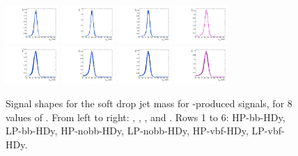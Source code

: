 \begin{figure}[htbp]
  \includegraphics[width=0.18\textwidth]{fig/2Dfit/templateSignalVsMX_fromDC_VBFGbuToWW_MJJ_mu_HP_vbf_HDy.pdf}
  \includegraphics[width=0.18\textwidth]{fig/2Dfit/templateSignalVsMX_fromDC_VBFRadToWW_MJJ_mu_HP_vbf_HDy.pdf}
  \includegraphics[width=0.18\textwidth]{fig/2Dfit/templateSignalVsMX_fromDC_VBFZprToWW_MJJ_mu_HP_vbf_HDy.pdf}
  \includegraphics[width=0.18\textwidth]{fig/2Dfit/templateSignalVsMX_fromDC_VBFWprToWZ_MJJ_mu_HP_vbf_HDy.pdf}\\
  \includegraphics[width=0.18\textwidth]{fig/2Dfit/templateSignalVsMX_fromDC_VBFGbuToWW_MJJ_mu_LP_vbf_HDy.pdf}
  \includegraphics[width=0.18\textwidth]{fig/2Dfit/templateSignalVsMX_fromDC_VBFRadToWW_MJJ_mu_LP_vbf_HDy.pdf}
  \includegraphics[width=0.18\textwidth]{fig/2Dfit/templateSignalVsMX_fromDC_VBFZprToWW_MJJ_mu_LP_vbf_HDy.pdf}
  \includegraphics[width=0.18\textwidth]{fig/2Dfit/templateSignalVsMX_fromDC_VBFWprToWZ_MJJ_mu_LP_vbf_HDy.pdf}\\
  \caption{
    Signal shapes for the soft drop jet mass \MJ for \VBF-produced signals, for 8 values of \MX.
    From left to right: \GBulktoWW, \RadtoWW, \ZprtoWW, and \WprtoWZ.
    Rows 1 to 6: HP-bb-HDy, LP-bb-HDy, HP-nobb-HDy, LP-nobb-HDy, HP-vbf-HDy, LP-vbf-HDy.
  }
  \label{fig:MJJShapes_VBF_HDy_Run2}
\end{figure}

